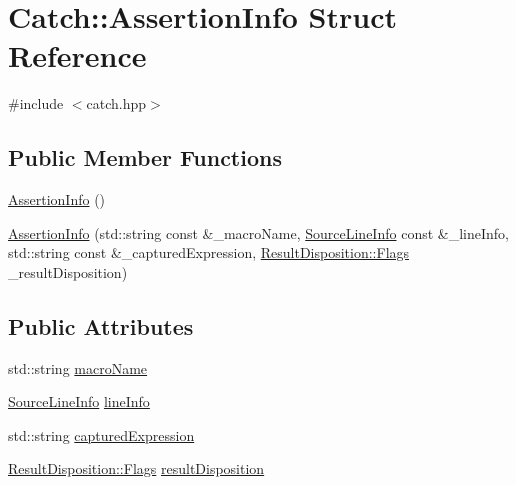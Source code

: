 \hypertarget{struct_catch_1_1_assertion_info}{}\section{Catch\+:\+:Assertion\+Info Struct Reference}
\label{struct_catch_1_1_assertion_info}


{\ttfamily \#include $<$catch.\+hpp$>$}

\subsection*{Public Member Functions}
\begin{DoxyCompactItemize}
\item 
\mbox{\hyperlink{struct_catch_1_1_assertion_info_a15c29d306c86361f842a0351a6003b9f}{Assertion\+Info}} ()
\item 
\mbox{\hyperlink{struct_catch_1_1_assertion_info_aaf6cc3eebd40391e54d37ed42953c73f}{Assertion\+Info}} (std\+::string const \&\+\_\+macro\+Name, \mbox{\hyperlink{struct_catch_1_1_source_line_info}{Source\+Line\+Info}} const \&\+\_\+line\+Info, std\+::string const \&\+\_\+captured\+Expression, \mbox{\hyperlink{struct_catch_1_1_result_disposition_a3396cad6e2259af326b3aae93e23e9d8}{Result\+Disposition\+::\+Flags}} \+\_\+result\+Disposition)
\end{DoxyCompactItemize}
\subsection*{Public Attributes}
\begin{DoxyCompactItemize}
\item 
std\+::string \mbox{\hyperlink{struct_catch_1_1_assertion_info_ac2e59e8c89e00eb3390768f50d540b18}{macro\+Name}}
\item 
\mbox{\hyperlink{struct_catch_1_1_source_line_info}{Source\+Line\+Info}} \mbox{\hyperlink{struct_catch_1_1_assertion_info_a17bdbb404ba12658034f833be2f4c3e7}{line\+Info}}
\item 
std\+::string \mbox{\hyperlink{struct_catch_1_1_assertion_info_af7c1d3cbfa346e9a303030fa0ef0cb54}{captured\+Expression}}
\item 
\mbox{\hyperlink{struct_catch_1_1_result_disposition_a3396cad6e2259af326b3aae93e23e9d8}{Result\+Disposition\+::\+Flags}} \mbox{\hyperlink{struct_catch_1_1_assertion_info_a60353b3632ab2f827162f2b2d6911073}{result\+Disposition}}
\end{DoxyCompactItemize}


